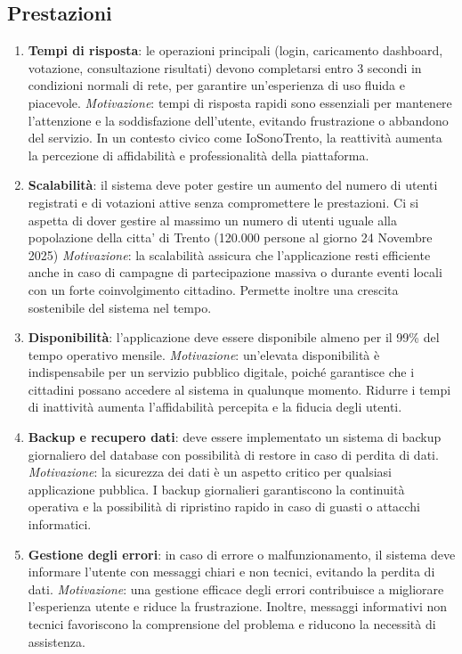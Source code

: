 \documentclass{article}
\begin{document}
\subsection{Prestazioni}
\begin{enumerate}[label=\textbf{RNF\arabic*}, resume]
	\item \textbf{Tempi di risposta}: le operazioni principali (login, caricamento dashboard, votazione, consultazione risultati) devono completarsi entro 3 secondi in condizioni normali di rete, per garantire un’esperienza di uso fluida e piacevole.  
	\textit{Motivazione}: tempi di risposta rapidi sono essenziali per mantenere l’attenzione e la soddisfazione dell’utente, evitando frustrazione o abbandono del servizio. In un contesto civico come IoSonoTrento, la reattività aumenta la percezione di affidabilità e professionalità della piattaforma.

	\item \textbf{Scalabilità}: il sistema deve poter gestire un aumento del numero di utenti registrati e di votazioni attive senza compromettere le prestazioni. Ci si aspetta di dover gestire al massimo un numero di utenti uguale alla popolazione della citta' di Trento (120.000 persone al giorno 24 Novembre 2025)  
	\textit{Motivazione}: la scalabilità assicura che l’applicazione resti efficiente anche in caso di campagne di partecipazione massiva o durante eventi locali con un forte coinvolgimento cittadino. Permette inoltre una crescita sostenibile del sistema nel tempo.

	\item \textbf{Disponibilità}: l’applicazione deve essere disponibile almeno per il 99\% del tempo operativo mensile.  
	\textit{Motivazione}: un’elevata disponibilità è indispensabile per un servizio pubblico digitale, poiché garantisce che i cittadini possano accedere al sistema in qualunque momento. Ridurre i tempi di inattività aumenta l’affidabilità percepita e la fiducia degli utenti.

	\item \textbf{Backup e recupero dati}: deve essere implementato un sistema di backup giornaliero del database con possibilità di restore in caso di perdita di dati.  
	\textit{Motivazione}: la sicurezza dei dati è un aspetto critico per qualsiasi applicazione pubblica. I backup giornalieri garantiscono la continuità operativa e la possibilità di ripristino rapido in caso di guasti o attacchi informatici.

	\item \textbf{Gestione degli errori}: in caso di errore o malfunzionamento, il sistema deve informare l’utente con messaggi chiari e non tecnici, evitando la perdita di dati.  
	\textit{Motivazione}: una gestione efficace degli errori contribuisce a migliorare l’esperienza utente e riduce la frustrazione. Inoltre, messaggi informativi non tecnici favoriscono la comprensione del problema e riducono la necessità di assistenza.


\end{enumerate}
\end{document}
